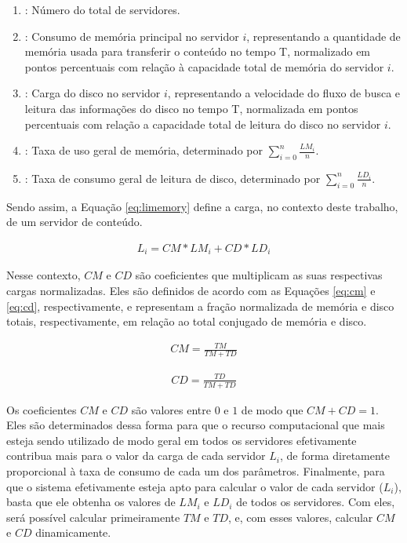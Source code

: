 \begin{enumerate}
    \item[$n$]: Número do total de servidores.
    \item[$LM_i$]: Consumo de memória principal no servidor $i$, representando a quantidade de memória usada para transferir o conteúdo no tempo T, normalizado em pontos percentuais com relação à capacidade total de memória do servidor $i$.
    \item[$LD_i$]: Carga do disco no servidor $i$, representando a velocidade do fluxo de busca e leitura das informações do disco no tempo T, normalizada em pontos percentuais com relação a capacidade total de leitura do disco no servidor $i$.
    \item[$TM$]: Taxa de uso geral de memória, determinado por $\displaystyle\sum_{i=0}^n \frac{LM_i}{n}$.
    \item[$TD$]: Taxa de consumo geral de leitura de disco, determinado por $\displaystyle\sum_{i=0}^n \frac{LD_i}{n}$. 
\end{enumerate}

Sendo assim, a Equação \mbox{\ref{eq:limemory}} define a carga, no contexto deste trabalho, de um servidor de conteúdo.

\begin{gather} \label{eq:limemory}
    L_i = CM * LM_i + CD * LD_i
\end{gather}

Nesse contexto, $CM$ e $CD$ são coeficientes que multiplicam as suas respectivas cargas normalizadas. Eles são definidos de acordo com as Equações \ref{eq:cm} e \ref{eq:cd}, respectivamente, e representam a fração normalizada de memória e disco totais, respectivamente, em relação ao total conjugado de memória e disco.

\begin{gather} \label{eq:cm}
    CM = \frac{TM}{TM + TD}
\end{gather}

\begin{gather} \label{eq:cd}
    CD = \frac{TD}{TM + TD}
\end{gather}

Os coeficientes $CM$ e $CD$ são valores entre $0$ e $1$ de modo que $CM + CD = 1$. Eles são determinados dessa forma para que o recurso computacional que mais esteja sendo utilizado de modo geral em todos os servidores efetivamente contribua mais para o valor da carga de cada servidor $L_i$, de forma diretamente proporcional à taxa de consumo de cada um dos parâmetros. Finalmente, para que o sistema efetivamente esteja apto para calcular o valor de cada servidor ($L_i$), basta que ele obtenha os valores de $LM_i$ e $LD_i$ de todos os servidores. Com eles, será possível calcular primeiramente $TM$ e $TD$, e, com esses valores, calcular $CM$ e $CD$ dinamicamente.

